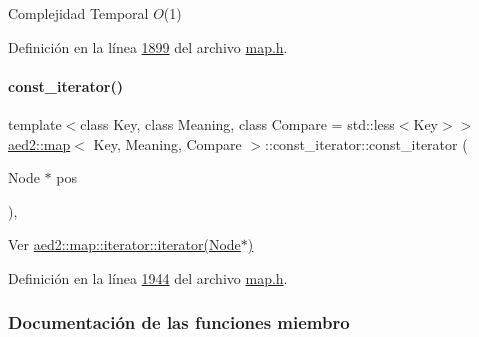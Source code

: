 \begin{DoxyDescription}
\item[Complejidad Temporal]$O$(1)
\end{DoxyDescription}

Definición en la línea \hyperlink{map_8h_source_l01899}{1899} del archivo \hyperlink{map_8h_source}{map.\+h}.

\mbox{\label{classaed2_1_1map_1_1const__iterator_a195d395708167dca23f9ce49f7c604f3_a195d395708167dca23f9ce49f7c604f3}} 
\paragraph{\texorpdfstring{const\+\_\+iterator()}{const\_iterator()}\hspace{0.1cm}{\footnotesize\ttfamily [3/3]}}
{\footnotesize\ttfamily template$<$class Key, class Meaning, class Compare = std\+::less$<$\+Key$>$$>$ \\
\hyperlink{classaed2_1_1map}{aed2\+::map}$<$ Key, Meaning, Compare $>$\+::const\+\_\+iterator\+::const\+\_\+iterator (\begin{DoxyParamCaption}\item[{Node $\ast$}]{pos }\end{DoxyParamCaption})\hspace{0.3cm}{\ttfamily [inline]}, {\ttfamily [private]}}



Ver \hyperlink{classaed2_1_1map_1_1iterator_ab0ea21abcb32b6d5a72cf341b9029838_ab0ea21abcb32b6d5a72cf341b9029838}{aed2\+::map\+::iterator\+::iterator(\+Node$\ast$)} 



Definición en la línea \hyperlink{map_8h_source_l01944}{1944} del archivo \hyperlink{map_8h_source}{map.\+h}.



\subsubsection{Documentación de las funciones miembro}
\mbox{\label{classaed2_1_1map_1_1const__iterator_a174e7b81e88253d936fb14512f00ef69_a174e7b81e88253d936fb14512f00ef69}} 
